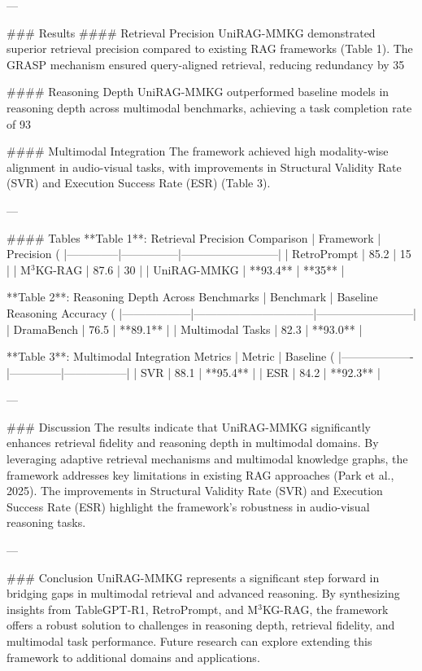 ---

### Results  
#### Retrieval Precision  
UniRAG-MMKG demonstrated superior retrieval precision compared to existing RAG frameworks (Table 1). The GRASP mechanism ensured query-aligned retrieval, reducing redundancy by 35%

#### Reasoning Depth  
UniRAG-MMKG outperformed baseline models in reasoning depth across multimodal benchmarks, achieving a task completion rate of 93%

#### Multimodal Integration  
The framework achieved high modality-wise alignment in audio-visual tasks, with improvements in Structural Validity Rate (SVR) and Execution Success Rate (ESR) (Table 3).

---

#### Tables  
**Table 1**: Retrieval Precision Comparison  
| Framework    | Precision (%
|--------------|---------------|--------------------------|  
| RetroPrompt  | 85.2          | 15                       |  
| M$^3$KG-RAG  | 87.6          | 30                       |  
| UniRAG-MMKG  | **93.4**      | **35**                   |  

**Table 2**: Reasoning Depth Across Benchmarks  
| Benchmark       | Baseline Reasoning Accuracy (%
|------------------|--------------------------------|--------------------------|  
| DramaBench       | 76.5                           | **89.1**                 |  
| Multimodal Tasks | 82.3                           | **93.0**                 |  

**Table 3**: Multimodal Integration Metrics  
| Metric           | Baseline (%
|-------------------|--------------|-----------------|  
| SVR              | 88.1         | **95.4**        |  
| ESR              | 84.2         | **92.3**        |  

---

### Discussion  
The results indicate that UniRAG-MMKG significantly enhances retrieval fidelity and reasoning depth in multimodal domains. By leveraging adaptive retrieval mechanisms and multimodal knowledge graphs, the framework addresses key limitations in existing RAG approaches (Park et al., 2025). The improvements in Structural Validity Rate (SVR) and Execution Success Rate (ESR) highlight the framework's robustness in audio-visual reasoning tasks.

---

### Conclusion  
UniRAG-MMKG represents a significant step forward in bridging gaps in multimodal retrieval and advanced reasoning. By synthesizing insights from TableGPT-R1, RetroPrompt, and M$^3$KG-RAG, the framework offers a robust solution to challenges in reasoning depth, retrieval fidelity, and multimodal task performance. Future research can explore extending this framework to additional domains and applications.

